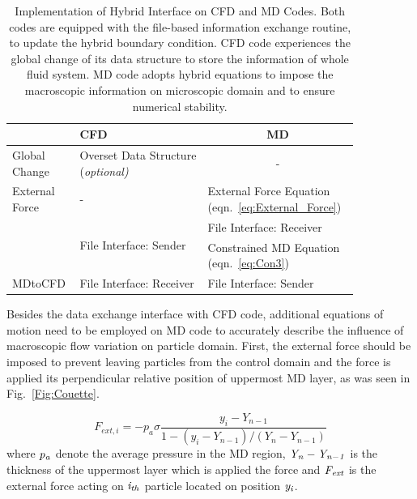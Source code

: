 \documentclass[conference,final]{IEEEtran}
\begin{document}
\begin{table}[t]
  \caption{\small Implementation of Hybrid Interface on CFD and MD Codes. Both codes are equipped with the file-based information exchange routine, to update the hybrid boundary condition. CFD code experiences the global change of its data structure to store the information of whole fluid system. MD code adopts hybrid equations to impose the macroscopic information on microscopic domain and to ensure numerical stability.}
  \label{table:interface_implementation}
  \centering
  \begin{tabular}{>{\centering}p{0.15\linewidth} || p{0.35\linewidth} | p{0.35\linewidth} }
\hline
  & \centering CFD & \multicolumn{1}{c}{MD} \\
\hline
 Global Change & Overset Data Structure (\it{optional}) & \multicolumn{1}{c}{-} \\
\hline
 \centering External Force & \centering - & External Force Equation (eqn.~\ref{eq:External_Force}) \\
\hline
 \multirow{2}{*}{CFDtoMD} &  \multirow{2}{*}{File Interface: Sender} & {File Interface: Receiver} \\
 & & Constrained MD Equation (eqn.~\ref{eq:Con3}) \\
\hline
 MDtoCFD & File Interface: Receiver & File Interface: Sender \\
\hline
\end{tabular}
\vspace{-1em}
\end{table}


Besides the data exchange interface with CFD code, additional equations of motion need to be employed on MD code to accurately describe the influence of macroscopic flow variation on particle domain.
First, the external force should be imposed to prevent leaving particles from the control domain and the force is applied its perpendicular relative position of uppermost MD layer, as was seen in Fig.~\ref{Fig:Couette}.

\vspace{-.2em}
\begin{equation}
 F_{ext, i} = -p_{a}\sigma\frac{y_{i}-Y_{n-1}}{1-(y_{i}-Y_{n-1})/(Y_{n}-Y_{n-1})}
 \label{eq:External_Force}
\end{equation}
\normalsize
where $\it p_{a}$ denote the average pressure in the MD region, $\it Y_{n}-Y_{n-1}$ is the thickness of the uppermost layer which is applied the force and $\it F_{ext}$ is the external force acting on $\it i_{th}$ particle located on position $\it y_{i}$.
\end{document}
